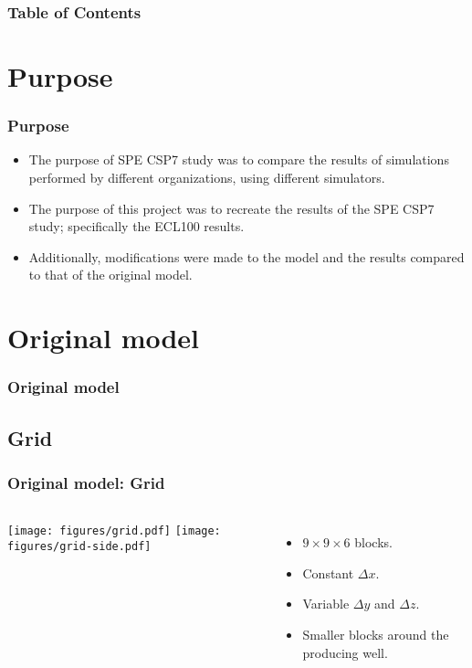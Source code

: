 \documentclass{beamer}
\begin{document}
 
\frame{\titlepage}

\begin{frame}
    \frametitle{Table of Contents}
    \tableofcontents
\end{frame}
 
\section{Purpose}
\begin{frame}
    \frametitle{Purpose}
    \begin{itemize}
        \item The purpose of SPE CSP7 study was to compare the results of simulations performed by different organizations, using different simulators.
        \item The purpose of this project was to recreate the results of the SPE CSP7 study; specifically the ECL100 results.
        \item Additionally, modifications were made to the model and the results compared to that of the original model.
    \end{itemize}
\end{frame}

\section{Original model}
\begin{frame}
    \frametitle{Original model}
\end{frame}

\subsection{Grid}
\begin{frame}
    \frametitle{Original model: Grid}
    \begin{columns}[c]
            \texttt{[image: figures/grid.pdf]}
            \texttt{[image: figures/grid-side.pdf]}
            \begin{itemize}
                \item $9\times 9 \times 6$ blocks.
                \item Constant $\Delta x$.
                \item Variable $\Delta y$ and $\Delta z$. 
                \item Smaller blocks around the producing well.
            \end{itemize}
    \end{columns}
\end{frame}
\end{document}
